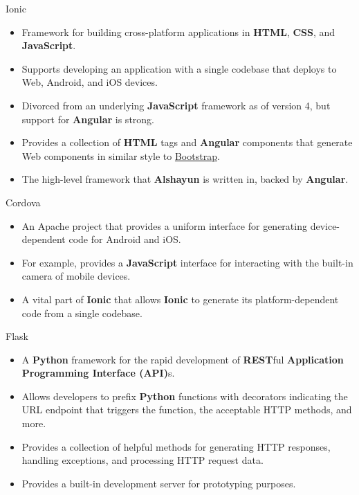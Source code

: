 \documentclass{beamer}
\begin{document}
\begin{frame}{Ionic}
    \begin{itemize}
        \item Framework for building cross-platform applications in
            \textbf{HTML}, \textbf{CSS}, and \textbf{JavaScript}.
        \item Supports developing an application with a single codebase that
            deploys to Web, Android, and iOS devices.
        \item Divorced from an underlying \textbf{JavaScript} framework as of
            version 4, but support for \textbf{Angular} is strong.
        \item Provides a collection of \textbf{HTML} tags and \textbf{Angular}
            components that generate Web components in similar style to
            \href{https://getbootstrap.com/}{Bootstrap}.
        \item The high-level framework that \textbf{Alshayun} is written in,
            backed by \textbf{Angular}.
    \end{itemize}
\end{frame}

\begin{frame}{Cordova}
    \begin{itemize}
        \item An Apache project that provides a uniform interface for generating
            device-dependent code for Android and iOS.
        \item For example, provides a \textbf{JavaScript} interface for
            interacting with the built-in camera of mobile devices.
        \item A vital part of \textbf{Ionic} that allows \textbf{Ionic} to
            generate its platform-dependent code from a single codebase.
    \end{itemize}
\end{frame}

\begin{frame}{Flask}
    \begin{itemize}
        \item A \textbf{Python} framework for the rapid development of
            \textbf{REST}ful \textbf{Application Programming Interface (API)}s.
        \item Allows developers to prefix \textbf{Python} functions with
            decorators indicating the URL endpoint that triggers the function,
            the acceptable HTTP methods, and more.
        \item Provides a collection of helpful methods for generating HTTP
            responses, handling exceptions, and processing HTTP request data.
        \item Provides a built-in development server for prototyping purposes.
    \end{itemize}
\end{frame}
\end{document}
